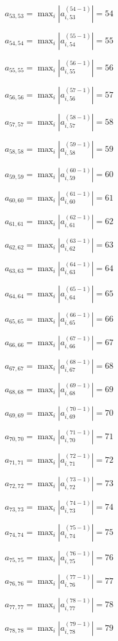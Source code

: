 \documentclass[a4paper,12pt]{article}
\begin{document}
$a _{ 53, 53 } =  \max _i |a _{ i, 53 } ^{ (54 - 1) } | = 54$

$a _{ 54, 54 } =  \max _i |a _{ i, 54 } ^{ (55 - 1) } | = 55$

$a _{ 55, 55 } =  \max _i |a _{ i, 55 } ^{ (56 - 1) } | = 56$

$a _{ 56, 56 } =  \max _i |a _{ i, 56 } ^{ (57 - 1) } | = 57$

$a _{ 57, 57 } =  \max _i |a _{ i, 57 } ^{ (58 - 1) } | = 58$

$a _{ 58, 58 } =  \max _i |a _{ i, 58 } ^{ (59 - 1) } | = 59$

$a _{ 59, 59 } =  \max _i |a _{ i, 59 } ^{ (60 - 1) } | = 60$

$a _{ 60, 60 } =  \max _i |a _{ i, 60 } ^{ (61 - 1) } | = 61$

$a _{ 61, 61 } =  \max _i |a _{ i, 61 } ^{ (62 - 1) } | = 62$

$a _{ 62, 62 } =  \max _i |a _{ i, 62 } ^{ (63 - 1) } | = 63$

$a _{ 63, 63 } =  \max _i |a _{ i, 63 } ^{ (64 - 1) } | = 64$

$a _{ 64, 64 } =  \max _i |a _{ i, 64 } ^{ (65 - 1) } | = 65$

$a _{ 65, 65 } =  \max _i |a _{ i, 65 } ^{ (66 - 1) } | = 66$

$a _{ 66, 66 } =  \max _i |a _{ i, 66 } ^{ (67 - 1) } | = 67$

$a _{ 67, 67 } =  \max _i |a _{ i, 67 } ^{ (68 - 1) } | = 68$

$a _{ 68, 68 } =  \max _i |a _{ i, 68 } ^{ (69 - 1) } | = 69$

$a _{ 69, 69 } =  \max _i |a _{ i, 69 } ^{ (70 - 1) } | = 70$

$a _{ 70, 70 } =  \max _i |a _{ i, 70 } ^{ (71 - 1) } | = 71$

$a _{ 71, 71 } =  \max _i |a _{ i, 71 } ^{ (72 - 1) } | = 72$

$a _{ 72, 72 } =  \max _i |a _{ i, 72 } ^{ (73 - 1) } | = 73$

$a _{ 73, 73 } =  \max _i |a _{ i, 73 } ^{ (74 - 1) } | = 74$

$a _{ 74, 74 } =  \max _i |a _{ i, 74 } ^{ (75 - 1) } | = 75$

$a _{ 75, 75 } =  \max _i |a _{ i, 75 } ^{ (76 - 1) } | = 76$

$a _{ 76, 76 } =  \max _i |a _{ i, 76 } ^{ (77 - 1) } | = 77$

$a _{ 77, 77 } =  \max _i |a _{ i, 77 } ^{ (78 - 1) } | = 78$

$a _{ 78, 78 } =  \max _i |a _{ i, 78 } ^{ (79 - 1) } | = 79$
\end{document}
